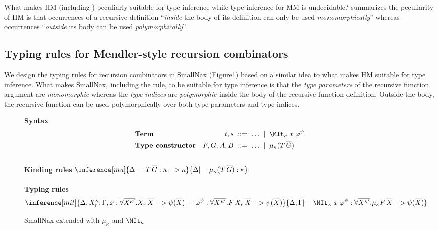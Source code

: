 What makes HM (including ) peculiarly suitable for
type inference while type inference for MM is undecidable?
\citet{Hen93} summarizes the peculiarity of HM is that occurrences of
a recursive definition ``\emph{inside} the body of its definition can
only be used \emph{monomorphically}'' whereas occurrences ``\emph{outside}
its body can be used \emph{polymorphically}''.

\subsection{Typing rules for Mendler-style recursion combinators}
\label{sec:naxTyInfer:rec:rules}
We design the typing rules for recursion combinators in SmallNax
(Figure\;\ref{fig:SmallNaxRec}) based on a similar idea to
what makes HM suitable for type inference. What makes SmallNax, including
the  rule, to be suitable for type inference is that
the \emph{type parameters} of the recursive function argument are
\emph{monomorphic} whereas the \emph{type indices} are \emph{polymorphic}
inside the body of the recursive function definition. Outside the body,
the recursive function can be used polymorphically over both type parameters
and type indices.

\begin{figure}
\begin{singlespace}
\textbf{Syntax}\vspace*{-.5ex}
\begin{align*}
&\textbf{Term}&
t,s&~::= ~ \dots \; \mid \; \MIt_\kappa\;x\;\varphi^\psi
\\
&\textbf{Type constructor}&
F,G,A,B&~::= ~ \dots \; \mid \; \mu_\kappa (T\,\overline{G})
\end{align*}
~ \vspace*{-1.3ex} \\
\textbf{Kinding rules} \qquad
$ \inference[\sc mu]{\Delta |- T\,\overline{G} : \kappa -> \kappa}{
	\Delta |- \mu_\kappa (T\,\overline{G}) : \kappa}
$ \\ ~ \\
\textbf{Typing rules}
\[ \inference[\sc mit]{
	\Delta,X_r^\kappa;
	\Gamma,x:\forall\overline{X^{\kappa'}}.X_r\,\overline{X} -> \psi(\overline{X})
	|- \varphi^\psi :
	\forall\overline{X^{\kappa'}}.F\,X_r\,\overline{X} -> \psi(\overline{X})
	}{ \Delta;\Gamma |- \MIt_\kappa\;x\;\varphi^\psi:
	\forall\overline{X^{\kappa'}}.\mu_\kappa F\,\overline{X} -> \psi(\overline{X}) }
\]
\end{singlespace}
\caption{SmallNax extended with $\mu_\kappa$ and $\MIt_\kappa$}
\label{fig:SmallNaxRec}
\end{figure}

